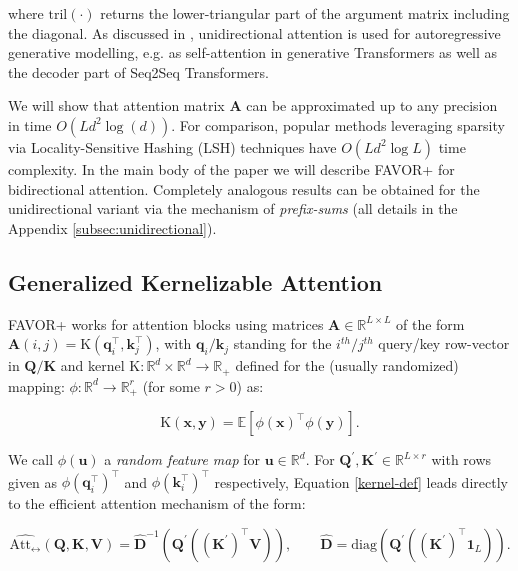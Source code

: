 where $\mathrm{tril}(\cdot)$ returns the lower-triangular part of the argument matrix including the diagonal. As discussed in \citep{transformer}, unidirectional attention is used for autoregressive generative modelling, e.g. as self-attention in generative Transformers as well as the decoder part of Seq2Seq Transformers.

We will show that attention matrix $\mathbf{A}$ can be approximated up to any precision in time $O (L d^2\log(d))$. For comparison, popular methods leveraging sparsity via Locality-Sensitive Hashing (LSH) techniques \citep{reformer} have $O(L d^2 \log L)$ time complexity. In the main body of the paper we will describe FAVOR+ for bidirectional attention. Completely analogous results can be obtained for the unidirectional variant via the mechanism of \textit{prefix-sums} (all details in the Appendix \ref{subsec:unidirectional}).

\subsection{Generalized Kernelizable Attention}
\label{sec:gka}

FAVOR+ works for attention blocks using matrices $\mathbf{A} \in \mathbb{R}^{L \times L}$ of the form $\mathbf{A}(i,j) = \mathrm{K}(\mathbf{q}_{i}^{\top},\mathbf{k}_{j}^{\top})$, with $\mathbf{q}_{i}/\mathbf{k}_{j}$ standing for the $i^{th}/j^{th}$ query/key row-vector in $\mathbf{Q}/\mathbf{K}$ and kernel $\mathrm{K}:\mathbb{R}^{d} \times \mathbb{R}^{d} \rightarrow \mathbb{R}_{+}$ defined for the (usually randomized) mapping: $\phi: \mathbb{R}^{d} \rightarrow \mathbb{R}_{+}^{r}$ (for some $r >0$) as:

\begin{equation}
\label{kernel-def}
\mathrm{K}(\mathbf{x}, \mathbf{y}) = \mathbb{E}[\phi(\mathbf{x})^{\top}\phi(\mathbf{y})].
\end{equation}

We call $\phi(\mathbf{u})$ a \textit{random feature map} for $\mathbf{u} \in \mathbb{R}^{d}$. 
For $\mathbf{Q}^{\prime},\mathbf{K}^{\prime} \in \mathbb{R}^{L \times r}$ with rows given as $\phi(\mathbf{q}_{i}^{\top})^{\top}$ and $\phi(\mathbf{k}_{i}^{\top})^{\top}$ respectively, Equation \ref{kernel-def} leads directly to the efficient attention mechanism of the form:

\begin{equation}
    \widehat{\mathrm{Att}_\leftrightarrow} (\mathbf{Q}, \mathbf{K}, \mathbf{V}) = \widehat{\mathbf{D}}^{-1} (\mathbf{Q}^{\prime}((\mathbf{K}^{\prime})^{\top} \mathbf{V})), \quad 
    \quad \widehat{\mathbf{D}} = \mathrm{diag} (\mathbf{Q}^{\prime}((\mathbf{K}^{\prime})^{\top} \mathbf{1}_L) ). 
\end{equation}

